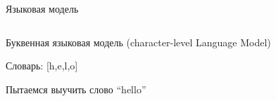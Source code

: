 \documentclass[notes,12pt, aspectratio=169]{beamer}
\newenvironment{wideitemize}{\itemize\addtolength{\itemsep}{10pt}}{\enditemize}
\begin{document}
\begin{frame}{Языковая модель}
	\begin{columns}
		\begin{column}{.4\linewidth}
			\begin{wideitemize} 
				\item  Буквенная языковая модель (character-level Language Model)
				\item Словарь:  [h,e,l,o]
				\item Пытаемся выучить слово “hello”
			\end{wideitemize}
		\end{column}	
		\begin{column}{.7\linewidth}			
			\begin{center}

\end{center}
\end{column}
\end{columns}
\end{frame}
\end{document}
